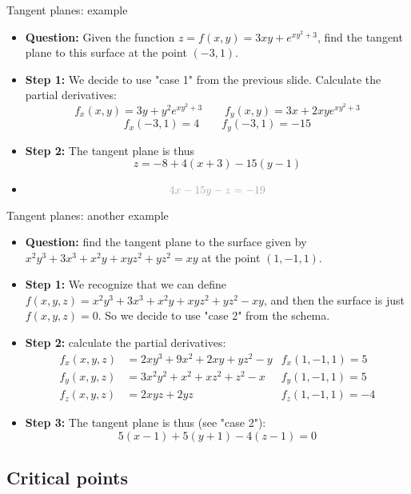 \begin{frame}{Tangent planes: example}
    \begin{itemize}
        \item
            \textbf{Question:} Given the function $z=f(x,y)=3xy+e^{xy^2+3}$, find the tangent plane to this surface at the point $(-3,1)$.
        \item \textbf{Step 1:} We decide to use "case 1" from the previous slide. Calculate the partial derivatives:
            \[f_x(x,y)=3y+y^2e^{xy^2+3}  \qquad  f_y(x,y)=3x+2xye^{xy^2+3}\]
            \[f_x(-3,1)=4 \qquad f_y(-3,1)=-15\]
        \item \textbf{Step 2:}
            The tangent plane is thus
            \[\boxed{z=-8+4(x+3)-15(y-1)}\]
        \item {}
            \[{\gray{4x-15y-z=-19}}\]
    \end{itemize}
\end{frame}

\begin{frame}{Tangent planes: another example}
    \begin{itemize}
        \item
            \textbf{Question:} find the tangent plane to the surface given by $x^2y^3+3x^3+x^2y+xyz^2+yz^2=xy$ at the point $(1,-1,1)$.
        \item \textbf{Step 1:}  We recognize that we can define $f(x,y,z)=x^2y^3+3x^3+x^2y+xyz^2+yz^2-xy$, and then the surface is just $f(x,y,z)=0$. So we decide to use "case 2" from the schema.
        \item \textbf{Step 2:} calculate the partial derivatives:
            \begin{align*}
                f_x(x,y,z)&=2xy^3+9x^2+2xy+yz^2-y & f_x(1,-1,1)=5\\
                f_y(x,y,z)&=3x^2y^2+x^2+xz^2+z^2-x & f_y(1,-1,1)=5\\
                f_z(x,y,z)&=2xyz+2yz & f_z(1,-1,1)=-4
            \end{align*}
        \item \textbf{Step 3:} The tangent plane is thus (see "case 2"):
            \[\boxed{5(x-1)+5(y+1)-4(z-1)=0}\]

    \end{itemize}
\end{frame}

\subsection{Critical points}

